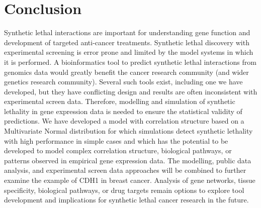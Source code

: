 \section{Conclusion}

Synthetic lethal interactions are important for understanding gene function and development of targeted anti-cancer treatments.  Synthetic lethal discovery with experimental screening is error prone and limited by the model systems in which it is performed.  A bioinformatics tool to predict synthetic lethal interactions from genomics data would greatly benefit the cancer research community (and wider genetics research community).  Several such tools exist, including one we have developed, but they have conflicting design and results are often inconsistent with experimental screen data. Therefore, modelling and simulation of synthetic lethality in gene expression data is needed to ensure the statistical validity of predictions.  We have developed a model with correlation structure based on a Multivariate Normal distribution for which simulations detect synthetic lethality with high performance in simple cases and which has the potential to be developed to model complex correlation structure, biological pathways, or patterns observed in empirical gene expression data.  The modelling, public data analysis, and experimental screen data approaches will be combined to further examine the example of CDH1 in breast cancer.  Analysis of gene networks, tissue specificity, biological pathways, or drug targets remain options to explore tool development and implications for synthetic lethal cancer research in the future. 
